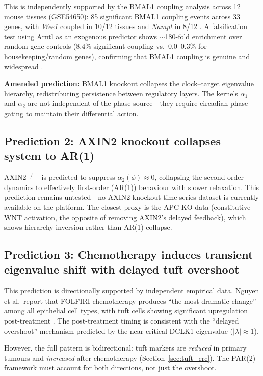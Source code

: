 \documentclass[11pt,letterpaper]{article}
\theoremstyle{definition}
\theoremstyle{remark}
\begin{document}
This is independently supported by the BMAL1 coupling analysis across 12 mouse tissues (GSE54650): 85 significant BMAL1 coupling events across 33 genes, with \textit{Wee1} coupled in 10/12 tissues and \textit{Nampt} in 8/12 \citep{whiteside2026paper_e}. A falsification test using Arntl as an exogenous predictor shows $\sim$180-fold enrichment over random gene controls (8.4\% significant coupling vs.\ 0.0--0.3\% for housekeeping/random genes), confirming that BMAL1 coupling is genuine and widespread \citep{whiteside2026paper_a}.

\textbf{Amended prediction:} BMAL1 knockout collapses the clock--target eigenvalue hierarchy, redistributing persistence between regulatory layers. The kernels $\alpha_1$ and $\alpha_2$ are not independent of the phase source---they require circadian phase gating to maintain their differential action.

\subsection{Prediction 2: AXIN2 knockout collapses system to AR(1)}

AXIN2$^{-/-}$ is predicted to suppress $\alpha_2(\phi) \approx 0$, collapsing the second-order dynamics to effectively first-order (AR(1)) behaviour with slower relaxation. This prediction remains untested---no AXIN2-knockout time-series dataset is currently available on the platform. The closest proxy is the APC-KO data (constitutive WNT activation, the opposite of removing AXIN2's delayed feedback), which shows hierarchy inversion rather than AR(1) collapse.

\subsection{Prediction 3: Chemotherapy induces transient eigenvalue shift with delayed tuft overshoot}

This prediction is directionally supported by independent empirical data. Nguyen et al.\ report that FOLFIRI chemotherapy produces ``the most dramatic change'' among all epithelial cell types, with tuft cells showing significant upregulation post-treatment \citep{nguyen2025colonic, mzoughi2025chemotherapy}. The post-treatment timing is consistent with the ``delayed overshoot'' mechanism predicted by the near-critical DCLK1 eigenvalue ($|\lambda| \approx 1$).

However, the full pattern is bidirectional: tuft markers are \textit{reduced} in primary tumours and \textit{increased} after chemotherapy (Section~\ref{sec:tuft_crc}). The PAR(2) framework must account for both directions, not just the overshoot.
\end{document}
